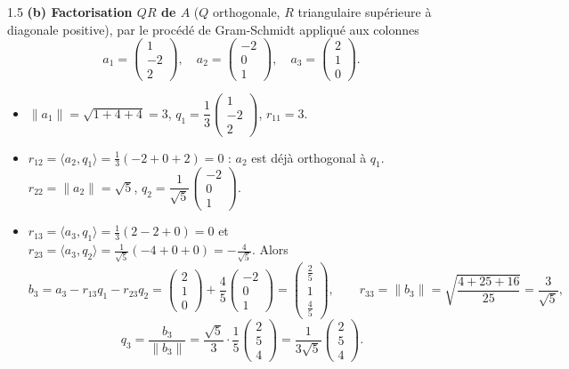 \documentclass[12pt]{article}
\begin{document}
\begin{spacing}{1.5}
\textbf{(b) Factorisation $QR$ de $A$} ($Q$ orthogonale, $R$ triangulaire supérieure à diagonale positive), par le procédé de Gram-Schmidt appliqué aux colonnes
\[
a_1=\begin{pmatrix}1\\-2\\2\end{pmatrix},\quad a_2=\begin{pmatrix}-2\\0\\1\end{pmatrix},\quad a_3=\begin{pmatrix}2\\1\\0\end{pmatrix}.
\]
\begin{itemize}
\item $\|a_1\|=\sqrt{1+4+4}=3$, \quad $q_1=\dfrac13\begin{pmatrix}1\\-2\\2\end{pmatrix}$, \quad $r_{11}=3$.
\item $r_{12}=\langle a_2,q_1\rangle=\frac13(-2+0+2)=0$ : $a_2$ est déjà orthogonal à $q_1$. $r_{22}=\|a_2\|=\sqrt5$, \quad $q_2=\dfrac1{\sqrt5}\begin{pmatrix}-2\\0\\1\end{pmatrix}$.
\item $r_{13}=\langle a_3,q_1\rangle=\frac13(2-2+0)=0$ et $r_{23}=\langle a_3,q_2\rangle=\frac{1}{\sqrt5}(-4+0+0)=-\frac4{\sqrt5}$. Alors
\[
b_3=a_3-r_{13}q_1-r_{23}q_2=\begin{pmatrix}2\\1\\0\end{pmatrix}+\frac45\begin{pmatrix}-2\\0\\1\end{pmatrix}=\begin{pmatrix}\frac25\\[1mm]1\\[1mm]\frac45\end{pmatrix},\qquad r_{33}=\|b_3\|=\sqrt{\frac{4+25+16}{25}}=\frac{3}{\sqrt5},
\]
\[
q_3=\frac{b_3}{\|b_3\|}=\frac{\sqrt5}{3}\cdot\frac15\begin{pmatrix}2\\5\\4\end{pmatrix}=\frac{1}{3\sqrt5}\begin{pmatrix}2\\5\\4\end{pmatrix}.
\]
\end{itemize}
\end{spacing}
\end{document}
